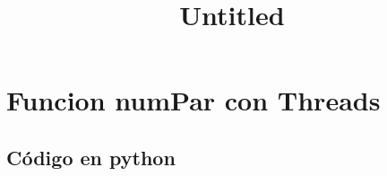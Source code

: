 \documentclass[11pt]{article}
\title{Untitled}
\begin{document}
    
    \maketitle
    
    

    
    \hypertarget{funcion-numpar-con-threads}{%
\section{Funcion numPar con Threads}\label{funcion-numpar-con-threads}}

    \hypertarget{cuxf3digo-en-python}{%
\subsection{Código en python}\label{cuxf3digo-en-python}}
\end{document}
